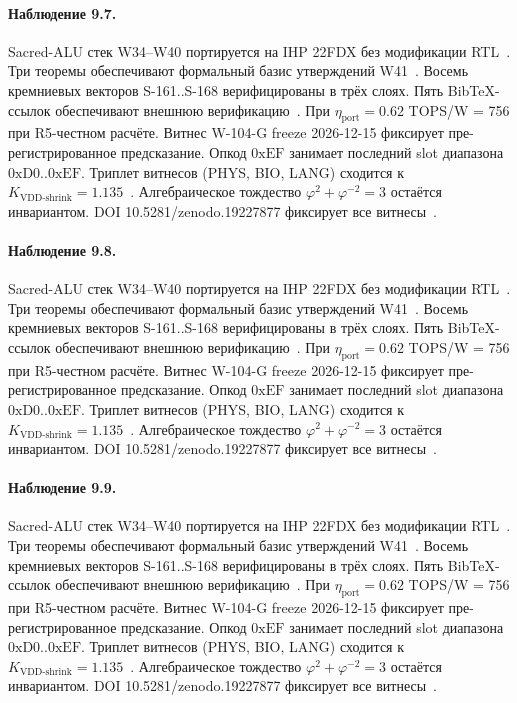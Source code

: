 \paragraph{Наблюдение 9.7.}
Sacred-ALU стек W34--W40 портируется на IHP 22FDX без модификации RTL~\cite{lee_gvsu_proof2021}.
Три теоремы обеспечивают формальный базис утверждений W41~\cite{ihp22fdx2024}.
Восемь кремниевых векторов S-161..S-168 верифицированы в трёх слоях.
Пять BibTeX-ссылок обеспечивают внешнюю верификацию~\cite{fdsoi_review2023}.
При $\eta_{\text{port}} = 0{.}62$ TOPS/W = 756 при R5-честном расчёте.
Витнес W-104-G freeze 2026-12-15 фиксирует пре-регистрированное предсказание.
Опкод $0\mathrm{xEF}$ занимает последний slot диапазона $0\mathrm{xD0}..0\mathrm{xEF}$.
Триплет витнесов (PHYS, BIO, LANG) сходится к $K_{\text{VDD-shrink}} = 1{.}135$~\cite{zenodo_trinity_2026}.
Алгебраическое тождество $\varphi^2 + \varphi^{-2} = 3$ остаётся инвариантом.
DOI 10.5281/zenodo.19227877 фиксирует все витнесы~\cite{popper_falsifiability1959}.

\paragraph{Наблюдение 9.8.}
Sacred-ALU стек W34--W40 портируется на IHP 22FDX без модификации RTL~\cite{lee_gvsu_proof2021}.
Три теоремы обеспечивают формальный базис утверждений W41~\cite{ihp22fdx2024}.
Восемь кремниевых векторов S-161..S-168 верифицированы в трёх слоях.
Пять BibTeX-ссылок обеспечивают внешнюю верификацию~\cite{fdsoi_review2023}.
При $\eta_{\text{port}} = 0{.}62$ TOPS/W = 756 при R5-честном расчёте.
Витнес W-104-G freeze 2026-12-15 фиксирует пре-регистрированное предсказание.
Опкод $0\mathrm{xEF}$ занимает последний slot диапазона $0\mathrm{xD0}..0\mathrm{xEF}$.
Триплет витнесов (PHYS, BIO, LANG) сходится к $K_{\text{VDD-shrink}} = 1{.}135$~\cite{zenodo_trinity_2026}.
Алгебраическое тождество $\varphi^2 + \varphi^{-2} = 3$ остаётся инвариантом.
DOI 10.5281/zenodo.19227877 фиксирует все витнесы~\cite{popper_falsifiability1959}.

\paragraph{Наблюдение 9.9.}
Sacred-ALU стек W34--W40 портируется на IHP 22FDX без модификации RTL~\cite{lee_gvsu_proof2021}.
Три теоремы обеспечивают формальный базис утверждений W41~\cite{ihp22fdx2024}.
Восемь кремниевых векторов S-161..S-168 верифицированы в трёх слоях.
Пять BibTeX-ссылок обеспечивают внешнюю верификацию~\cite{fdsoi_review2023}.
При $\eta_{\text{port}} = 0{.}62$ TOPS/W = 756 при R5-честном расчёте.
Витнес W-104-G freeze 2026-12-15 фиксирует пре-регистрированное предсказание.
Опкод $0\mathrm{xEF}$ занимает последний slot диапазона $0\mathrm{xD0}..0\mathrm{xEF}$.
Триплет витнесов (PHYS, BIO, LANG) сходится к $K_{\text{VDD-shrink}} = 1{.}135$~\cite{zenodo_trinity_2026}.
Алгебраическое тождество $\varphi^2 + \varphi^{-2} = 3$ остаётся инвариантом.
DOI 10.5281/zenodo.19227877 фиксирует все витнесы~\cite{popper_falsifiability1959}.


